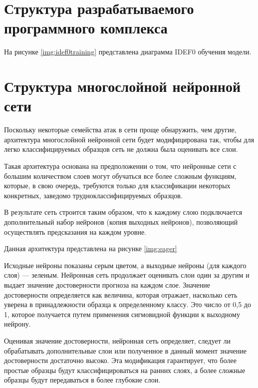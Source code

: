 \section{Структура разрабатываемого программного комплекса}


На рисунке \ref*{img:idef0training} представлена диаграмма IDEF0 обучения модели.


\section{Структура многослойной нейронной сети}

Поскольку некоторые семейства атак в сети проще обнаружить, 
чем другие, архитектура многослойной нейронной сети будет модифицирована так, 
чтобы для легко классифицируемых образцов сеть не должна была оценивать все слои.

Такая архитектура основана на
предположении о том, что нейронные сети с большим количеством слоев могут
обучаться все более сложным функциям, которые, в свою очередь, 
требуются только для классификации некоторых конкретных, заведомо
трудноклассифицируемых образцов.

В результате сеть строится таким
образом, что к каждому слою подключается дополнительный набор нейронов
(копия выходных нейронов), позволяющий осуществлять предсказания на каждом уровне.

Данная архитектура представлена на рисунке \ref*{img:eager}


Исходные нейроны показаны серым цветом, а выходные нейроны (для каждого слоя) --- зеленым. 
Нейронная сеть продолжает оценивать слои один за другим и выдает значение достоверности прогноза на каждом слое.
Значение достоверности определяется как величина, которая отражает, насколько
сеть уверена в принадлежности образца  к определенному классу. Это число от 0,5 до 1, которое
получается путем применения сигмовидной функции к выходному нейрону.

Оценивая значение достоверности, нейронная сеть определяет, следует ли обрабатывать дополнительные 
слои или полученное в данный момент значение достоверности достаточно высоко. Эта модификация гарантирует, 
что более простые образцы будут классифицироваться на ранних слоях, 
а более сложные образцы будут передаваться в более глубокие слои.


